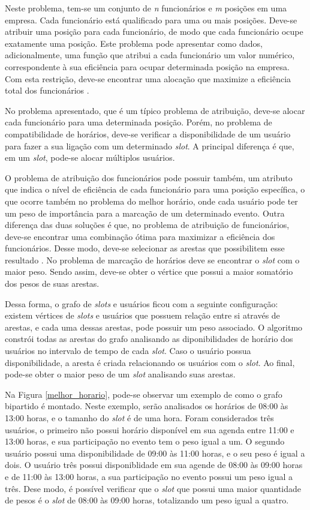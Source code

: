 Neste problema, tem-se um conjunto de \textit{n} funcionários e \textit{m} posições em uma empresa. Cada funcionário está qualificado para uma ou mais posições. Deve-se atribuir uma posição para cada funcionário, de modo que cada funcionário ocupe exatamente uma posição. Este problema pode apresentar como dados, adicionalmente, uma função que atribui a cada funcionário um valor numérico, correspondente à sua eficiência para ocupar determinada posição na empresa. Com esta restrição, deve-se encontrar uma alocação que maximize a eficiência total dos funcionários \cite{Figuerado:Szwarcfiter:1999}.

No problema apresentado, que é um típico problema de atribuição, deve-se alocar cada funcionário para uma determinada posição. Porém, no problema de compatibilidade de horários, deve-se verificar a disponibilidade de um usuário para fazer a sua ligação com um determinado \textit{slot}. A principal diferença é que, em um \textit{slot}, pode-se alocar múltiplos usuários.

O problema de atribuição dos funcionários pode possuir também, um atributo que indica o nível de eficiência de cada funcionário para uma posição específica, o que ocorre também no problema do melhor horário, onde cada usuário pode ter um peso de importância para a marcação de um determinado evento. Outra diferença das duas soluções é que, no problema de atribuição de funcionários, deve-se encontrar uma combinação ótima para maximizar a eficiência dos funcionários. Desse modo, deve-se selecionar as arestas que possibilitem esse resultado \cite{Figuerado:Szwarcfiter:1999}. No problema de marcação de horários deve se encontrar o \textit{slot} com o maior peso. Sendo assim, deve-se obter o vértice que possui a maior somatório dos pesos de suas arestas.

Dessa forma, o grafo de \textit{slots} e usuários ficou com a seguinte configuração: existem vértices de \textit{slots} e usuários que possuem relação entre si através de arestas, e cada uma dessas arestas, pode possuir um peso associado. O algoritmo constrói todas as arestas do grafo analisando as diponibilidades de horário dos usuários no intervalo de tempo de cada \textit{slot}. Caso o usuário possua disponibilidade, a aresta é criada relacionando os usuários com o \textit{slot}. Ao final, pode-se obter o maior peso de um \textit{slot} analisando suas arestas.

Na Figura \ref{melhor_horario}, pode-se observar um exemplo de como o grafo bipartido é montado. Neste exemplo, serão analisados os horários de 08:00 às 13:00 horas, e o tamanho do \textit{slot} é de uma hora. Foram considerados três usuários, o primeiro não possui horário disponível em sua agenda entre 11:00 e 13:00 horas, e sua participação no evento tem o peso igual a um. O segundo usuário possui uma disponibilidade de 09:00 às 11:00 horas, e o seu peso é igual a dois. O usuário três possui disponiblidade em sua agende de 08:00 às 09:00 horas e de 11:00 às 13:00 horas, a sua participação no evento possui um peso igual a três. Dese modo, é possível verificar que o \textit{slot} que possui uma maior quantidade de pesos é o \textit{slot} de 08:00 às 09:00 horas, totalizando um peso igual a quatro.

